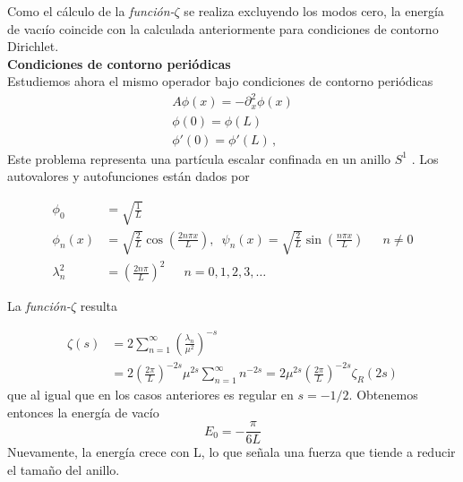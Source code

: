Como el cálculo de la {\it función-$\zeta$} se realiza excluyendo los modos cero, la
energía de vacıío coincide con la calculada anteriormente para condiciones
de contorno Dirichlet.\\



\textbf{Condiciones de contorno periódicas}\\

Estudiemos ahora el mismo operador bajo condiciones de contorno periódicas
\begin{equation}
\begin{array}{c}
	A \phi (x) = - \partial _x ^2 \phi (x) \\[5pt]
    \phi (0) = \phi (L)  \\[5pt]
    \phi ' (0) = \phi ' (L) \, ,
\end{array}
\end{equation}
Este problema representa una partícula escalar confinada en un anillo $S ^1$ .
Los autovalores y autofunciones están dados por


\begin{align}
	\phi _{0} &= \sqrt{\frac{1}{L}} \\[5pt]
	\phi _{n} (x) &= \sqrt{\frac{2}{L}} \cos \left( \frac{2 n \pi x}{L} \right),
	\, \, \,  \psi _n (x) =\sqrt{\frac{2}{L}} \sin \left( \frac{n \pi x}{L} \right) 
	\, \, \, \, \, \, \, \, \, n \neq 0
	\\[5pt]
	\lambda ^2 _n  &= \left( \frac{2 n \pi }{L} \right) ^2 
	\, \, \, \, \, \, \, \, \,
	 n = 0,1,2,3, \dots
\end{align}

La {\it función-$\zeta$} resulta

\begin{equation}
\begin{aligned}
\zeta  (s) &= 
2 \sum _{n=1} ^{\infty} \left( \frac{\lambda _n}{\mu ^2} \right)^{-s} \\[5pt]
&=  2 \left( \frac{2 \pi}{L} \right) ^{-2s} \mu ^{2s} \sum _{n=1} ^{\infty} n ^{-2s} =  
2 \mu ^{2s} \left( \frac{2 \pi}{L} \right) ^{-2s} \zeta _R (2s)
\end{aligned}
\end{equation}
que al igual que en los casos anteriores es regular en $s=-1/2$. Obtenemos
entonces la energía de vacío
\begin{equation}
E _0 = - \frac{\pi}{6 L}
\end{equation}
Nuevamente, la energía crece con L, lo que señala una fuerza que tiende a
reducir el tamaño del anillo.

